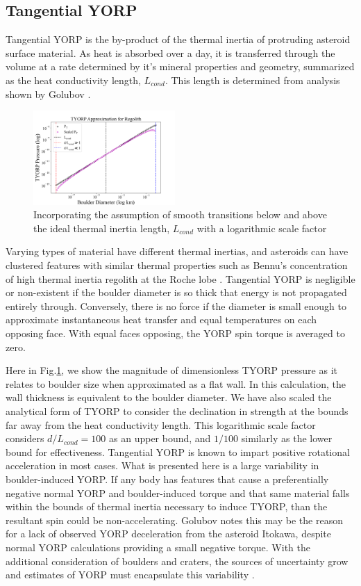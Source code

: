 \subsection{Tangential YORP}
Tangential YORP is the by-product of the thermal inertia of protruding asteroid surface material. As heat is absorbed over a day, it is transferred through the volume at a rate determined by it's mineral properties and geometry, summarized as the heat conductivity length, $L_{cond}$. This length is determined from analysis shown by Golubov \citep{Golubov2012}. 
\begin{figure}[H]
    \centering
    \includegraphics[width=0.48\textwidth]{fig/tyorp_regolith.png}
    \caption{Incorporating the assumption of smooth transitions below and above the ideal thermal inertia length, $L_{cond}$ with a logarithmic scale factor}
    \label{fig:tyorp_regolith}
\end{figure}

Varying types of material have different thermal inertias, and asteroids can have clustered features with similar thermal properties such as Bennu's concentration of high thermal inertia regolith at the Roche lobe \citep{Rozitis2020}. Tangential YORP is negligible or non-existent if the boulder diameter is so thick that energy is not propagated entirely through. Conversely, there is no force if the diameter is small enough to approximate instantaneous heat transfer and equal temperatures on each opposing face. With equal faces opposing, the YORP spin torque is averaged to zero. 

Here in Fig.\ref{fig:tyorp_regolith}, we show the magnitude of dimensionless TYORP pressure as it relates to boulder size when approximated as a flat wall. In this calculation, the wall thickness is equivalent to the boulder diameter. We have also scaled the analytical form of TYORP to consider the declination in strength at the bounds far away from the heat conductivity length. This logarithmic scale factor considers $d/L_{cond} = 100$ as an upper bound, and $1/100$ similarly as the lower bound for effectiveness.
Tangential YORP is known to impart positive rotational acceleration in most cases. What is presented here is a large variability in boulder-induced YORP. If any body has features that cause a preferentially negative normal YORP and boulder-induced torque and that same material falls within the bounds of thermal inertia necessary to induce TYORP, than the resultant spin could be non-accelerating. Golubov notes this may be the reason for a lack of observed YORP deceleration from the asteroid Itokawa, despite normal YORP calculations providing a small negative torque. With the additional consideration of boulders and craters, the sources of uncertainty grow and estimates of YORP must encapsulate this variability \citep{Golubov2012}. 

